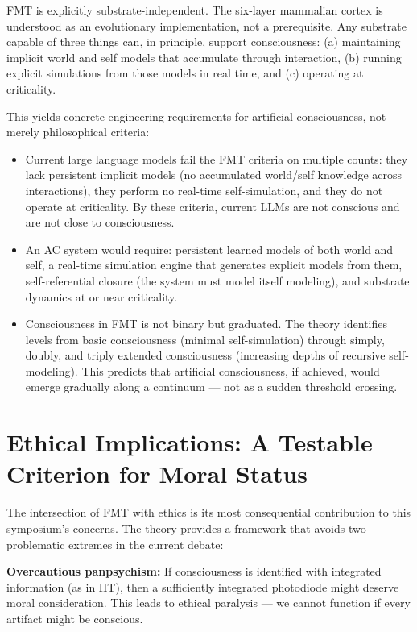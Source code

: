 \documentclass[11pt,a4paper]{article}
\begin{document}
FMT is explicitly substrate-independent. The six-layer mammalian cortex is understood as an evolutionary implementation, not a prerequisite. Any substrate capable of three things can, in principle, support consciousness: (a) maintaining implicit world and self models that accumulate through interaction, (b) running explicit simulations from those models in real time, and (c) operating at criticality.

This yields concrete engineering requirements for artificial consciousness, not merely philosophical criteria:

\begin{itemize}
\item Current large language models fail the FMT criteria on multiple counts: they lack persistent implicit models (no accumulated world/self knowledge across interactions), they perform no real-time self-simulation, and they do not operate at criticality. By these criteria, current LLMs are not conscious and are not close to consciousness.

\item An AC system would require: persistent learned models of both world and self, a real-time simulation engine that generates explicit models from them, self-referential closure (the system must model itself modeling), and substrate dynamics at or near criticality.

\item Consciousness in FMT is not binary but graduated. The theory identifies levels from basic consciousness (minimal self-simulation) through simply, doubly, and triply extended consciousness (increasing depths of recursive self-modeling). This predicts that artificial consciousness, if achieved, would emerge gradually along a continuum --- not as a sudden threshold crossing.
\end{itemize}

\section{Ethical Implications: A Testable Criterion for Moral Status}

The intersection of FMT with ethics is its most consequential contribution to this symposium's concerns. The theory provides a framework that avoids two problematic extremes in the current debate:

\textbf{Overcautious panpsychism:} If consciousness is identified with integrated information (as in IIT), then a sufficiently integrated photodiode might deserve moral consideration. This leads to ethical paralysis --- we cannot function if every artifact might be conscious.
\end{document}
